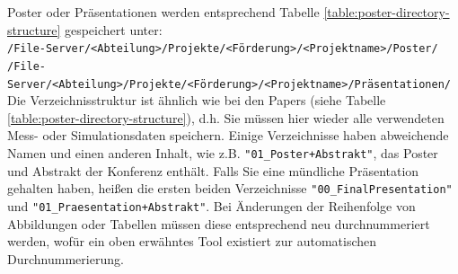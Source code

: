 \noindent Poster oder Präsentationen werden entsprechend Tabelle \ref{table:poster-directory-structure} gespeichert unter: \\
\texttt{/File-Server/<Abteilung>/Projekte/<Förderung>/<Projektname>/Poster/} \\
\texttt{/File-Server/<Abteilung>/Projekte/<Förderung>/<Projektname>/Präsentationen/} \\
%
Die Verzeichnisstruktur ist ähnlich wie bei den Papers (siehe Tabelle \ref{table:poster-directory-structure}), d.h. Sie müssen hier wieder alle verwendeten Mess- oder Simulationsdaten speichern. Einige Verzeichnisse haben abweichende Namen und einen anderen Inhalt, wie z.B. \texttt{"01\_Poster+Abstrakt"}, das Poster und Abstrakt der Konferenz enthält. Falls Sie eine mündliche Präsentation gehalten haben, heißen die ersten beiden Verzeichnisse \texttt{"00\_FinalPresentation"} und \linebreak
\texttt{"01\_Praesentation+Abstrakt"}. Bei Änderungen der Reihenfolge von Abbildungen oder Tabellen müssen diese entsprechend neu durchnummeriert werden, wofür ein oben erwähntes Tool existiert zur automatischen Durchnummerierung.

\begin{table}[H]
  \caption{%
  Die Daten jedes Beitrags müssen in acht Unterverzeichnissen gespeichert
  werden; weitere Hinweise: \\
  ** Wenn das Poster präsentiert wurde, lädt der jeweilige Präsentator die
  letzte und überarbeitete Version (d.h. nur die wirklich verwendeten, aber
  absolut vollständigen Daten) in das geschützte Verzeichnis \\
  ***Wenn die in einer Abbildung/Tabelle wiedergegebenen Daten aus verteilten
  Rohdatenverzeichnissen stammt, genügt es, hier nur das erzeugende Programm zu
  speichern%
  }

\label{table:poster-directory-structure}
\end{table}
